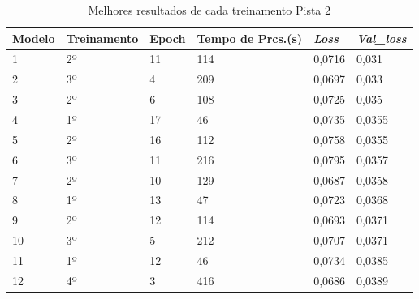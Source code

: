 \begin{table}[H]
\centering
\caption{Melhores resultados de cada treinamento Pista 2}
\label{tabela3}
\begin{tabular}{|l|l|l|l|l|l|}
\hline
\textbf{Modelo} & \textbf{Treinamento} & \textbf{Epoch} & \textbf{Tempo de Prcs.(s)} & \textit{\textbf{Loss}} & \textit{\textbf{Val\_loss}} \\ \hline
1                   & 2º                   & 11             & 114                        & 0,0716                 & 0,031                       \\
2                   & 3º                   & 4              & 209                        & 0,0697                 & 0,033                       \\
3                   & 2º                   & 6              & 108                        & 0,0725                 & 0,035                       \\
4                   & 1º                   & 17             & 46                         & 0,0735                 & 0,0355                      \\
5                   & 2º                   & 16             & 112                        & 0,0758                 & 0,0355                      \\
6                   & 3º                   & 11             & 216                        & 0,0795                 & 0,0357                      \\
7                   & 2º                   & 10             & 129                        & 0,0687                 & 0,0358                      \\
8                   & 1º                   & 13             & 47                         & 0,0723                 & 0,0368                      \\
9                   & 2º                   & 12             & 114                        & 0,0693                 & 0,0371                      \\
10                   & 3º                   & 5              & 212                        & 0,0707                 & 0,0371                      \\
11                   & 1º                   & 12             & 46                         & 0,0734                 & 0,0385                      \\
12                   & 4º                   & 3              & 416                        & 0,0686                 & 0,0389                      \\

\end{tabular}
\end{table}
